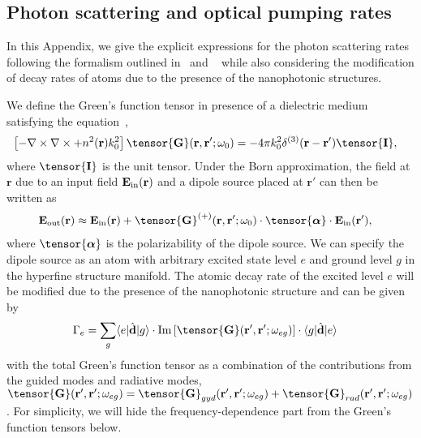 \documentclass[preprint,aps,pra,onecolumn,superscriptaddress]{revtex4-1} %
\def\br{\mathbf{r}}
\def\bra#1{\langle{#1}\rvert}%
\def\ket#1{\lvert{#1}\rangle}%
\newcommand{\mbf}[1]{\mathbf{#1}}
\newcommand{\inp}{{\rm in}}
\newcommand{\out}{{\rm out}}
\newcommand{\unittens}{\tensor{\mathbf{I}}}
\begin{document}
\begin{appendix}
\section{Photon scattering and optical pumping rates} \label{Appendix::Rates}

In this Appendix, we give the explicit expressions for the photon scattering rates following the formalism outlined in~\cite{Deutsch2010a} and ~\cite{Qi2016} while also considering the modification of decay rates of atoms due to the presence of the nanophotonic structures. 

We define the Green's function tensor in presence of a dielectric medium satisfying the equation~\cite{Qi2016},
	\begin{align} \label{Eq::GreensDiffEq}
		\left[ -\nabla\times\nabla\times + n^2(\mbf{r}) k_0^2 \right] \tensor{\mathbf{G}}(\br, \br';\omega_0) &= -4\pi 
k_0^2 \delta^{(3)}(\mathbf{r}-\mathbf{r}') \unittens,
	\end{align}
where $\unittens$ is the unit tensor.
Under the Born approximation, the field at $\br$ due to an input field $ \mathbf{E}_{\inp}(\br) $ and a dipole source placed at $\br'$ can then be written as
\begin{align}
		\mathbf{E}_{\out}(\br) 
		&\approx \mathbf{E}_{\inp}(\br)+ \tensor{\mathbf{G}}^{(+)}(\br , \br'; \omega_0) \cdot 
\tensor{\boldsymbol{\alpha}}\cdot \mathbf{E}_{\inp}(\br'), \label{Eq::ScatteredField}
\end{align}
where $ \tensor{\boldsymbol{\alpha}} $ is the polarizability of the dipole source.
We can specify the dipole source as an atom with arbitrary excited state level $ e $ and ground level $ g $ in the hyperfine structure manifold. 
The atomic decay rate of the excited level $ e $ will be modified due to the presence of the nanophotonic structure and can be given by
\begin{align}
\Gamma_e &= \sum_g \bra{e}\hat{\mathbf{d}}\ket{g} \cdot \mathrm{Im}\left[\tensor{\mathbf{G}}(\br',\br';\omega_{eg}) \right]\cdot \bra{g}\hat{\mathbf{d}}\ket{e}
\end{align}
with the total Green's function tensor as a combination of the contributions from the guided modes and radiative modes, $ \tensor{\mathbf{G}}(\br',\br';\omega_{eg})=\tensor{\mathbf{G}}_{gyd}(\br',\br';\omega_{eg})+\tensor{\mathbf{G}}_{rad}(\br',\br';\omega_{eg}) $.
For simplicity, we will hide the frequency-dependence part from the Green's function tensors below.

\end{appendix}
\end{document}
